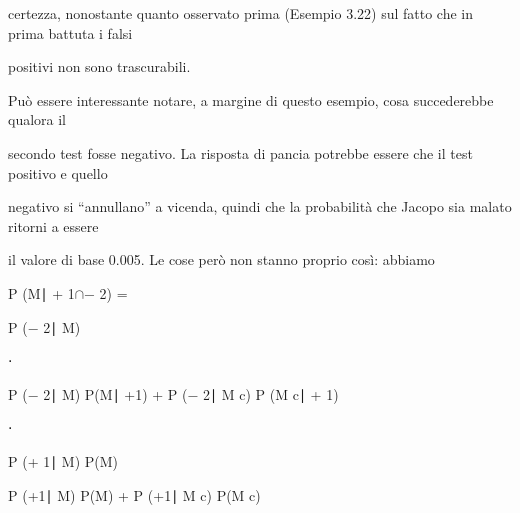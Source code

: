 \documentclass[a4paper,portrait,12pt]{article}
\begin{document}
\begin{flushleft}
certezza, nonostante quanto osservato prima (Esempio 3.22) sul fatto che in prima battuta i falsi
\end{flushleft}


\begin{flushleft}
positivi non sono trascurabili.
\end{flushleft}


\begin{flushleft}
Pu\`{o} essere interessante notare, a margine di questo esempio, cosa succederebbe qualora il
\end{flushleft}


\begin{flushleft}
secondo test fosse negativo. La risposta di pancia potrebbe essere che il test positivo e quello
\end{flushleft}


\begin{flushleft}
negativo si ``annullano'' a vicenda, quindi che la probabilit\`{a} che Jacopo sia malato ritorni a essere
\end{flushleft}


\begin{flushleft}
il valore di base 0.005. Le cose per\`{o} non stanno proprio così: abbiamo
\end{flushleft}


\begin{flushleft}
P (M∣ + 1$\cap$$-$ 2) =
\end{flushleft}





\begin{flushleft}
P ($-$ 2∣ M)
\end{flushleft}


⋅


\begin{flushleft}
P ($-$ 2∣ M) P(M∣ +1) + P ($-$ 2∣ M c) P (M c∣ + 1)
\end{flushleft}


⋅





\begin{flushleft}
P (+ 1∣ M) P(M)
\end{flushleft}


\begin{flushleft}
P (+1∣ M) P(M) + P (+1∣ M c) P(M c)
\end{flushleft}
\end{document}
